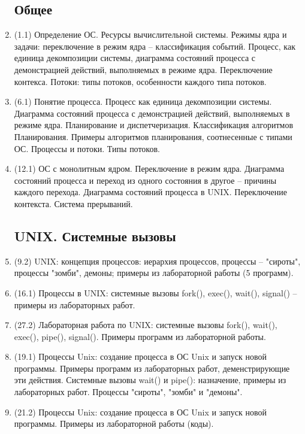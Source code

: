 \documentclass[a4paper,14pt]{extreport}
\begin{document}
\begin{enumerate}
\subsection{Общее}
    \item (1.1) Определение ОС. Ресурсы вычислительной системы. Режимы
        ядра и задачи: переключение в режим ядра -- классификация событий.
        Процесс, как единица декомпозиции системы, диаграмма состояний
        процесса с демонстрацией действий, выполняемых в режиме ядра.
        Переключение контекса. Потоки: типы потоков, особенности каждого типа
        потоков.
    \item (6.1) Понятие процесса. Процесс как единица декомпозиции системы.
        Диаграмма состояний процесса с демонстрацией действий,
        выполняемых в режиме ядра. Планирование и диспетчеризация.
        Классификация алгоритмов Планирования. Примеры алгоритмов
        планирования, соотнесенные с типами ОС. Процессы и потоки. Типы
        потоков.
    \item (12.1) ОС с монолитным ядром. Переключение в режим ядра.
        Диаграмма состояний процесса и переход из одного состояния в другое --
        причины каждого перехода. Диаграмма состояний процесса в UNIX.
        Переключение контекста. Система прерываний.
\subsection{UNIX. Системные вызовы}
    \item (9.2) UNIX: концепция процессов: иерархия процессов, процессы -- "сироты",
        процессы "зомби", демоны; примеры из лабораторной работы (5 программ).
    \item (16.1) Процессы в UNIX: системные вызовы fork(), exec(), wait(),
        signal() -- примеры из лабораторных работ.
    \item (27.2) Лабораторная работа по UNIX: системные вызовы fork(), wait(),
        exec(), pipe(), signal(). Примеры программ из лабораторной работы.
    \item (19.1) Процессы Unix: создание процесса в ОС Unix и запуск новой
        программы. Примеры программ из лабораторных работ,
        деменстрирующие эти действия. Системные вызовы wait() и pipe():
        назначение, примеры из лабораторных работ. Процессы "сироты", "зомби"
        и "демоны".
    \item (21.2) Процессы Unix: создание процесса в ОС Unix и запуск новой
        программы. Примеры из лабораторной работы (коды).


\end{enumerate}
\end{document}
